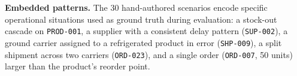 \textbf{Embedded patterns.} The 30 hand-authored scenarios encode specific operational situations used as ground truth during evaluation: a stock-out cascade on \texttt{PROD-001}, a supplier with a consistent delay pattern (\texttt{SUP-002}), a ground carrier assigned to a refrigerated product in error (\texttt{SHP-009}), a split shipment across two carriers (\texttt{ORD-023}), and a single order (\texttt{ORD-007}, 50 units) larger than the product's reorder point.

